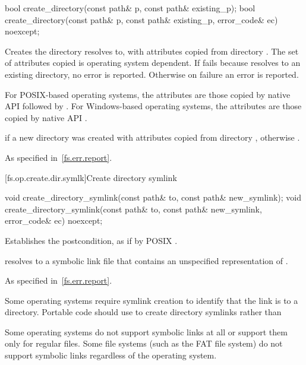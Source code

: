 %
\begin{itemdecl}
bool create_directory(const path& p, const path& existing_p);
bool create_directory(const path& p, const path& existing_p, error_code& ec) noexcept;
\end{itemdecl}

\begin{itemdescr}
\pnum
\effects
Creates the
  directory  resolves to, with
  attributes copied from directory . The set of attributes
  copied is operating system dependent.
  If  fails because  resolves to an existing directory,
  no error is reported. Otherwise on failure an error is reported.
\begin{note}
For POSIX-based operating systems, the
      attributes are those copied by native API 
      followed by . For
      Windows-based operating systems, the attributes are those copied by native
      API .
\end{note}

\pnum
\returns
{} if a new directory was created
  with attributes copied from directory ,
  otherwise .

\pnum
\throws
As specified in~\ref{fs.err.report}.
\end{itemdescr}


[fs.op.create.dir.symlk]{Create directory symlink}

%
\begin{itemdecl}
void create_directory_symlink(const path& to, const path& new_symlink);
void create_directory_symlink(const path& to, const path& new_symlink,
                              error_code& ec) noexcept;
\end{itemdecl}

\begin{itemdescr}
\pnum
\effects
Establishes the postcondition, as if by POSIX .

\pnum
\ensures
{} resolves to a symbolic link file that
  contains an unspecified representation of .

\pnum
\throws
As specified in~\ref{fs.err.report}.

\pnum
\begin{note}
Some operating systems require symlink creation to
  identify that the link is to a directory. Portable code should use  to create directory symlinks rather than 
\end{note}

\pnum
\begin{note}
Some operating systems do not support symbolic links at all or support
  them only for regular files.
  Some file systems (such as the FAT file system) do not
  support
  symbolic links regardless of the operating system.
\end{note}
\end{itemdescr}

